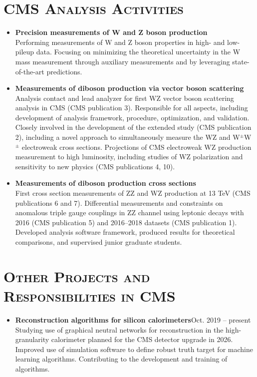 \documentclass[10pt]{res} %
\begin{document}
\begin{resume}
\section{\textsc{CMS Analysis Activities}}
\begin{itemize}
  \item\textbf{{Precision measurements of W and Z boson production}} \\
    Performing measurements of W and Z boson properties in high- and low-pileup data.
    Focusing on minimizing the theoretical uncertainty in the W mass measurement 
    through auxiliary measurements and by leveraging state-of-the-art
    predictions.
    
  \item\textbf{{Measurements of diboson production via vector boson scattering}} \\
    Analysis contact and lead analyzer for first WZ vector boson scattering analysis in CMS (CMS publication 3).
    Responsible for all aspects, 
    including development of analysis framework, procedure, optimization, and validation. 
    Closely involved in the development of the extended study (CMS publication 2), including a novel approach
    to simultaneously measure the WZ and W$^{\pm}$W$^{\pm}$ electroweak cross sections.
    Projections of CMS electroweak WZ production measurement to high luminosity, including studies of
    WZ polarization and sensitivity to new physics (CMS publications 4, 10). 

  \item\textbf{{Measurements of diboson production cross sections}} \\
    First cross section measurements
    of ZZ and WZ production at 13 TeV (CMS publications 6 and 7). 
    Differential measurements and constraints on anomalous
    triple gauge couplings in ZZ channel using leptonic decays
    with 2016 (CMS publication 5) and 2016--2018 datasets (CMS publication 1). 
    Developed analysis software framework, produced results for theoretical comparisons, 
    and supervised junior graduate students.
    
\end{itemize}

\section{\textsc{Other Projects and Responsibilities in CMS}}
\begin{itemize}
  \item\textbf{Reconstruction algorithms for silicon calorimeters}\hfill{Oct. 2019 -- present} \\
    Studying use of graphical neutral networks for reconstruction in the high-granularity calorimeter
    planned for the CMS detector upgrade in 2026. Improved use of simulation software to define 
    robust truth target for machine learning algorithms.
    Contributing to the development and training of algorithms.


\end{itemize}
\end{resume}
\end{document}
